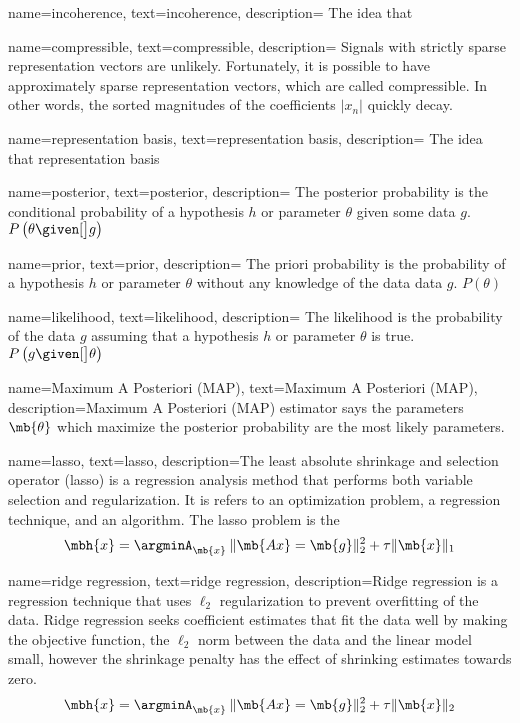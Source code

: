 {
name={incoherence},
text={incoherence},
description={ The idea that }
}

{
name={compressible},
text={compressible},
description={ Signals with strictly sparse representation vectors are unlikely. Fortunately, it is possible to have approximately sparse representation vectors, which are called compressible. In other words, the sorted magnitudes of the coefficients $|x_n|$ quickly decay.}
}

{
name={representation basis},
text={representation basis},
description={ The idea that representation basis}
}

{
name={posterior},
text={posterior},
description={ The posterior probability is the conditional probability of a hypothesis $h$ or parameter $\theta$ given some data $g$. $ P \left( \theta \given[\big] g \right) $}
}

{
name={prior},
text={prior},
description={ The priori probability is the probability of a hypothesis $h$ or parameter $\theta$ without any knowledge of the data data $g$. $ P \left( \theta \right) $}
}

{
name={likelihood},
text={likelihood},
description={ The likelihood is the probability of the data $g$ assuming that a hypothesis $h$ or parameter $\theta$ is true. $P \left( g \given[\big] \theta \right)$}
}

{
name={Maximum A Posteriori (MAP)},
text={Maximum A Posteriori (MAP)},
description={Maximum A Posteriori (MAP) estimator says the parameters  $ \mb{\theta} $ which maximize the \gls{posterior} probability are the most likely parameters.}
}

{
name={lasso},
text={lasso},
description={The least absolute shrinkage and selection operator (lasso) is a regression analysis method that performs both variable selection and regularization. It is refers to an optimization problem, a regression technique, and an algorithm. The lasso problem is the
%
\begin{equation*}
	\mbh{x} = \argminA_{\mb{x}} \: \| \mb{Ax} = \mb{g} \|_{2}^{2} + \tau \| \mb{x} \|_1
\end{equation*}
 }
}

{
name={ridge regression},
text={ridge regression},
description={Ridge regression is a regression technique that uses $\ell_2$ regularization to prevent overfitting of the data. Ridge regression seeks coefficient estimates that fit the data well by making the objective function, the $\ell_2$ norm between the data and the linear model small, however the shrinkage penalty has the effect of shrinking estimates towards zero. 
%
\begin{equation*}
	\mbh{x} = \argminA_{\mb{x}} \: \| \mb{Ax} = \mb{g} \|_{2}^{2} + \tau \| \mb{x} \|_2
\end{equation*}
 }
}

